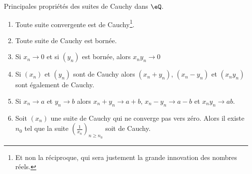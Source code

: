 \begin{proposition}        \label{PropFFDJooAapQlP}
    Principales propriétés des suites de Cauchy dans \( \eQ\).
    \begin{enumerate}
        \item       \label{ItemRKCIooJguHdji}
            Toute suite convergente est de Cauchy\footnote{Et non la réciproque, qui sera justement la grande innovation des nombres réels.}.
        \item       \label{ItemRKCIooJguHdjii}
            Toute suite de Cauchy est bornée.
        \item       \label{ItemRKCIooJguHdjiii}
            Si \( x_n\to 0\) et si \( (y_n)\) est bornée, alors \( x_ny_n\to 0\)
        \item
            Si \( (x_n)\) et \( (y_n)\) sont de Cauchy alors \( (x_n+y_n)\), \( (x_n-y_n)\) et \( (x_ny_n)\) sont également de Cauchy.
        \item       \label{ITEMooIAFSooAIUpAN}
            Si \( x_n\to a \) et \( y_n\to b \) alors \( x_n+y_n\to a+b\), \( x_n-y_n\to a-b\) et \(  x_ny_n\to ab  \).
        \item   \label{ItemRKCIooJguHdjvi}
            Soit \( (x_n)\) une suite de Cauchy qui ne converge pas vers zéro. Alors il existe \( n_0\) tel que la suite \( \left( \frac{1}{ x_n } \right)_{n\geq n_0}\) soit de Cauchy.
    \end{enumerate}
\end{proposition}


